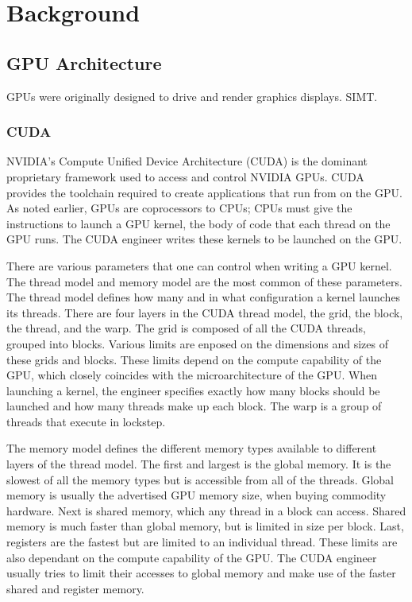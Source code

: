 \chapter{Background}
\label{chap:background}
\section{GPU Architecture}

GPUs were originally designed to drive and render graphics displays.
SIMT.

\subsection{CUDA}

NVIDIA's Compute Unified Device Architecture (CUDA) is the dominant proprietary framework used to access and control NVIDIA GPUs.
CUDA provides the toolchain required to create applications that run from on the GPU.
As noted earlier, GPUs are coprocessors to CPUs; CPUs must give the instructions to launch a GPU kernel, the body of code that each thread on the GPU runs.
The CUDA engineer writes these kernels to be launched on the GPU.

There are various parameters that one can control when writing a GPU kernel.
The thread model and memory model are the most common of these parameters.
The thread model defines how many and in what configuration a kernel launches its threads.
There are four layers in the CUDA thread model, the grid, the block, the thread, and the warp.
The grid is composed of all the CUDA threads, grouped into blocks.
Various limits are enposed on the dimensions and sizes of these grids and blocks.
These limits depend on the compute capability of the GPU, which closely coincides with the microarchitecture of the GPU.
When launching a kernel, the engineer specifies exactly how many blocks should be launched and how many threads make up each block.
The warp is a group of threads that execute in lockstep.

The memory model defines the different memory types available to different layers of the thread model.
The first and largest is the global memory.
It is the slowest of all the memory types but is accessible from all of the threads.
Global memory is usually the advertised GPU memory size, when buying commodity hardware.
Next is shared memory, which any thread in a block can access.
Shared memory is much faster than global memory, but is limited in size per block.
Last, registers are the fastest but are limited to an individual thread.
These limits are also dependant on the compute capability of the GPU.
The CUDA engineer usually tries to limit their accesses to global memory and make use of the faster shared and register memory.

